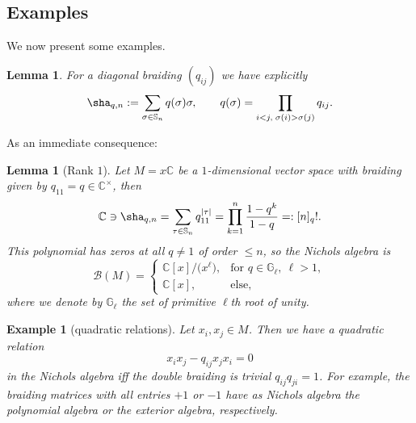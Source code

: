 \documentclass[pdftex]{sigma}%
\numberwithin{equation}{section}
\newtheorem{lem}[teo]{Lemma}
\newtheorem{ese}[teo]{Example}
\newcommand{\C}{\mathbb{C}}
\newcommand{\cB}{\mathcal{B}}
\begin{document}
\subsection{Examples}
We now present some examples.
\begin{lem}\label{lm_braidingfactor}
	For a diagonal braiding $(q_{ij})$ we have explicitly
	\[\sha_{q,n}: =\sum _{\sigma\in \mathbb{S}_n} q(\sigma)\sigma,\qquad
	q(\sigma)=\prod_{i<j,\;\sigma(i)>\sigma(j)} q_{ij}.\]
\end{lem}	

 As an immediate consequence:
\begin{lem}[Rank $1$]\label{lm_truncation}
 Let $M=x\C$ be a $1$-dimensional vector space with braiding given by $q_{11}=q\in\C^\times$, then
 \[\C\ni \sha_{q,n}=\sum_{\tau\in\mathbb{S}_n}q_{11}^{|\tau|}=\prod_{k=1}^n\frac{1-q^k}{1-q}=:[n]_q!.\]
 This polynomial has zeros at all $q\neq 1$ of order $\leq n$, so the Nichols algebra is
 \[\cB(M)=\begin{cases}
		\C[x]/\big(x^\ell\big), & \text{for } q\in\mathbb{G}_\ell, \ \ell>1,\\
		\C[x], & \text{else},
 \end{cases}\]
where we denote by $\mathbb{G}_\ell$ the set of primitive $\ell$th root of unity.
\end{lem}
\begin{ese}[quadratic relations]\label{exm_quadraticRelation}
	Let $x_i,x_j\in M$. Then we have a quadratic relation
	\[x_ix_j-q_{ij}x_jx_i=0\]
in the Nichols algebra iff the double braiding is trivial $q_{ij}q_{ji}=1$.
For example, the braiding matrices with all entries $+1$ or $-1$ have as Nichols algebra the polynomial algebra or the exterior algebra, respectively.
\end{ese}
\end{document}
